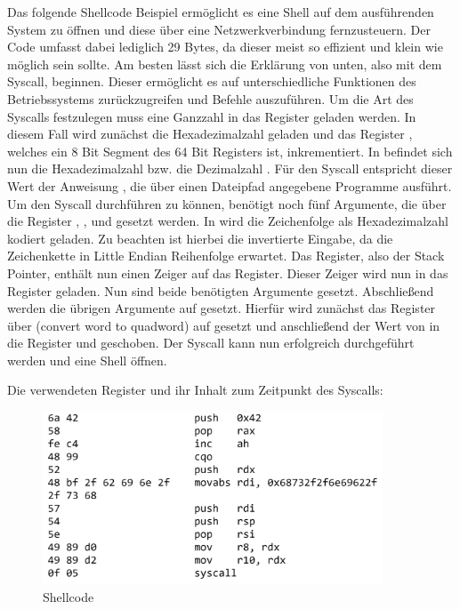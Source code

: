 Das folgende Shellcode Beispiel ermöglicht es eine Shell auf dem ausführenden System zu öffnen und diese über eine Netzwerkverbindung fernzusteuern. 
Der Code umfasst dabei lediglich 29 Bytes, da dieser meist so effizient und klein wie möglich sein sollte. 
Am besten lässt sich die Erklärung von unten, also mit dem Syscall, beginnen. 
Dieser ermöglicht es auf unterschiedliche Funktionen des Betriebssystems zurückzugreifen und Befehle auszuführen. 
Um die Art des Syscalls festzulegen muss eine Ganzzahl in das Register  geladen werden. 
In diesem Fall wird zunächst die Hexadezimalzahl  geladen und das Register , 
welches ein 8 Bit Segment des 64 Bit  Registers ist, inkrementiert. 
In  befindet sich nun die Hexadezimalzahl  bzw. die Dezimalzahl . 
Für den Syscall entspricht dieser Wert der Anweisung , 
die über einen Dateipfad angegebene Programme ausführt. Um den Syscall durchführen zu können, benötigt  noch fünf Argumente, 
die über die Register , ,  und  gesetzt werden. 
In  wird die Zeichenfolge  als Hexadezimalzahl kodiert geladen. 
Zu beachten ist hierbei die invertierte Eingabe, da  die Zeichenkette in Little Endian Reihenfolge erwartet. Das  Register, 
also der Stack Pointer, 
enthält nun einen Zeiger auf das  Register. Dieser Zeiger wird nun in das  Register geladen. Nun sind beide benötigten Argumente gesetzt. 
Abschließend werden die übrigen Argumente auf  gesetzt. Hierfür wird zunächst das  Register 
über  (convert word to quadword) auf  gesetzt und
anschließend der Wert von  in die Register  und  geschoben. 
Der Syscall kann nun erfolgreich durchgeführt werden und eine Shell öffnen. \cite{syscalls} \cite{execman}

Die verwendeten Register und ihr Inhalt zum Zeitpunkt des Syscalls:

\begin{figure}[h]
    \centering
    \includegraphics[width=0.9\textwidth,height=0.75\textheight,keepaspectratio]{images/shellstorm.png}
    \caption{Shellcode}
\end{figure}
\cite{shellstorm}


